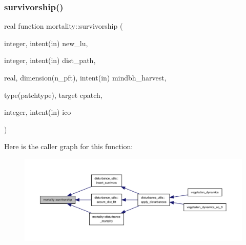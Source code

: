\subsubsection{\texorpdfstring{survivorship()}{survivorship()}}
{\footnotesize\ttfamily real function mortality\+::survivorship (\begin{DoxyParamCaption}\item[{integer, intent(in)}]{new\+\_\+lu,  }\item[{integer, intent(in)}]{dist\+\_\+path,  }\item[{real, dimension(n\+\_\+pft), intent(in)}]{mindbh\+\_\+harvest,  }\item[{type(patchtype), target}]{cpatch,  }\item[{integer, intent(in)}]{ico }\end{DoxyParamCaption})}

Here is the caller graph for this function\+:
\nopagebreak
\begin{figure}[H]
\begin{center}
\leavevmode
\includegraphics[width=350pt]{namespacemortality_aae8b4072e1f5c7c59cc76370de99d271_icgraph}
\end{center}
\end{figure}
